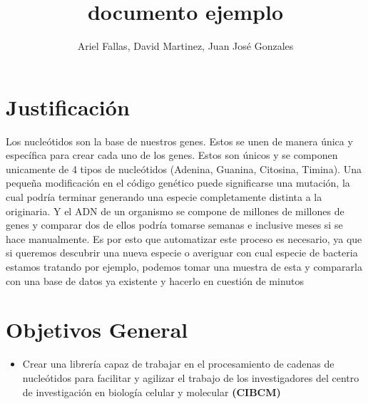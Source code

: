 \documentclass{article}
\begin{document}
\title{documento ejemplo}
\author{ Ariel Fallas, David Martinez, Juan José Gonzales}

\maketitle

\section{Justificación}

Los nucleótidos son la base de nuestros genes. Estos se unen de manera única y específica para crear cada uno de los genes. Estos son únicos y se componen unicamente de 4 tipos de nucleótidos (Adenina, Guanina, Citosina, Timina). 
Una pequeña modificación en el código genético puede significarse una mutación, la cual podría terminar generando una especie completamente distinta a la originaria. 
Y el ADN de un organismo se compone de millones de millones de genes y comparar dos de ellos podría tomarse semanas e inclusive meses si se hace manualmente. Es por esto que automatizar este proceso es necesario, ya que si queremos descubrir una nueva especie o averiguar con cual especie de bacteria estamos tratando por ejemplo, podemos tomar una muestra de esta y compararla con una base de datos ya existente y hacerlo en cuestión de minutos

\section{Objetivos General}

\begin{itemize}
\item Crear una librería capaz de trabajar en el procesamiento de cadenas de nucleótidos para facilitar y agilizar el trabajo de los investigadores del centro de investigación en biología celular y molecular \textbf{(CIBCM)}
\end{itemize}
\end{document}
